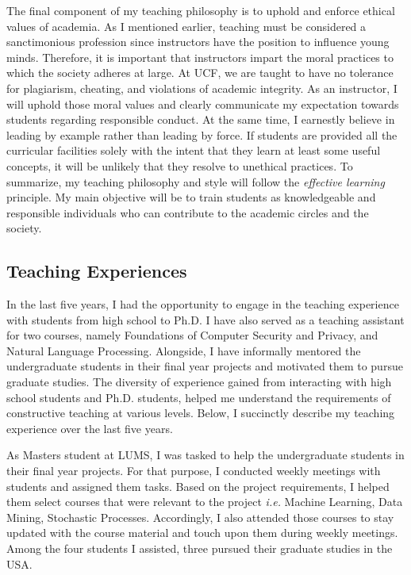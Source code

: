 \documentclass{NSF}
\newcommand{\ie}{{\em i.e.}\xspace}
\begin{document}
The final component of my teaching philosophy is to uphold and enforce ethical values of academia. As I mentioned earlier, teaching must be considered a sanctimonious profession since instructors have the position to influence young minds. Therefore, it is important that instructors impart the moral practices to which the society adheres at large. At UCF, we are taught to have no tolerance for plagiarism, cheating, and violations of academic integrity. As an instructor, I will uphold those moral values and clearly communicate my expectation towards students regarding responsible conduct. At the same time, I earnestly believe in leading by example rather than leading by force. If students are provided all the curricular facilities solely with the intent that they learn at least some useful concepts, it will be unlikely that they resolve to unethical practices. To summarize, my teaching philosophy and style will follow the {\em effective learning} principle. My main objective will be to train students as knowledgeable and responsible individuals who can contribute to the academic circles and the society. 



\vspace{-3mm}
\subsection*{Teaching Experiences}
In the last five years, I had the opportunity to engage in the teaching experience with students from high school to Ph.D. I have also served as a teaching assistant for two courses, namely Foundations of Computer Security and Privacy, and Natural Language Processing. Alongside, I have informally mentored the undergraduate students in their final year projects and motivated them to pursue graduate studies. The diversity of experience gained from interacting with high school students and Ph.D. students, helped me understand the requirements of constructive teaching at various levels. Below, I succinctly describe my teaching experience over the last five years.

As Masters student at LUMS, I was tasked to help the undergraduate students in their final year projects. For that purpose, I conducted weekly meetings with students and assigned them tasks. Based on the project requirements, I helped them select courses that were relevant to the project \ie Machine Learning, Data Mining, Stochastic Processes. Accordingly, I also attended those courses to stay updated with the course material and touch upon them during weekly meetings. Among the four students I assisted, three pursued their graduate studies in the USA.
\end{document}
